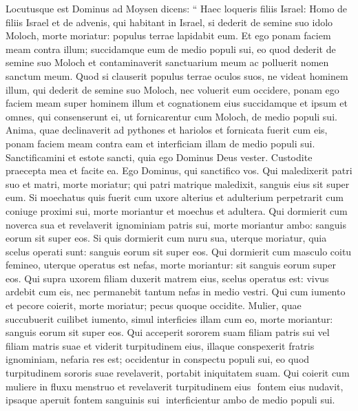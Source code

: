 \begin{biblechapter}
\begin{biblechapter}
\begin{biblechapter}
\begin{biblechapter}
\begin{biblechapter}
\begin{biblechapter}
\begin{biblechapter}
\begin{biblechapter}
\begin{biblechapter}
\begin{biblechapter}
\begin{biblechapter}
\begin{biblechapter}
\begin{biblechapter}
\begin{biblechapter}
\begin{biblechapter}
\begin{biblechapter}
\begin{biblechapter}
\begin{biblechapter}
\begin{biblechapter}
\begin{biblechapter}
\verse Locutusque est Dominus ad Moysen dicens: 
\verse “ Haec loqueris filiis Israel: Homo de filiis Israel et de advenis, qui habitant in Israel, si dederit de semine suo idolo Moloch, morte moriatur: populus terrae lapidabit eum. 
\verse Et ego ponam faciem meam contra illum; succidamque eum de medio populi sui, eo quod dederit de semine suo Moloch et contaminaverit sanctuarium meum ac polluerit nomen sanctum meum. 
\verse Quod si clauserit populus terrae oculos suos, ne videat hominem illum, qui dederit de semine suo Moloch, nec voluerit eum occidere, 
\verse ponam ego faciem meam super hominem illum et cognationem eius succidamque et ipsum et omnes, qui consenserunt ei, ut fornicarentur cum Moloch, de medio populi sui.
 \verse Anima, quae declinaverit ad pythones et hariolos et fornicata fuerit cum eis, ponam faciem meam contra eam et interficiam illam de medio populi sui. 
\verse Sanctificamini et estote sancti, quia ego Dominus Deus vester. 
\verse Custodite praecepta mea et facite ea. Ego Dominus, qui sanctifico vos.
 \verse Qui maledixerit patri suo et matri, morte moriatur; qui patri matrique maledixit, sanguis eius sit super eum.
 \verse Si moechatus quis fuerit cum uxore alterius et adulterium perpetrarit cum coniuge proximi sui, morte moriantur et moechus et adultera.
 \verse Qui dormierit cum noverca sua et revelaverit ignominiam patris sui, morte moriantur ambo: sanguis eorum sit super eos.
 \verse Si quis dormierit cum nuru sua, uterque moriatur, quia scelus operati sunt: sanguis eorum sit super eos.
 \verse Qui dormierit cum masculo coitu femineo, uterque operatus est nefas, morte moriantur: sit sanguis eorum super eos.
 \verse Qui supra uxorem filiam duxerit matrem eius, scelus operatus est: vivus ardebit cum eis, nec permanebit tantum nefas in medio vestri.
 \verse Qui cum iumento et pecore coierit, morte moriatur; pecus quoque occidite. 
 \verse Mulier, quae succubuerit cuilibet iumento, simul interficies illam cum eo, morte moriantur: sanguis eorum sit super eos.
 \verse Qui acceperit sororem suam filiam patris sui vel filiam matris suae et viderit turpitudinem eius, illaque conspexerit fratris ignominiam, nefaria res est; occidentur in conspectu populi sui, eo quod turpitudinem sororis suae revelaverit, portabit iniquitatem suam.
 \verse Qui coierit cum muliere in fluxu menstruo et revelaverit turpitudinem eius ­ fontem eius nudavit, ipsaque aperuit fontem sanguinis sui ­ interficientur ambo de medio populi sui.

\end{biblechapter}
\end{biblechapter}
\end{biblechapter}
\end{biblechapter}
\end{biblechapter}
\end{biblechapter}
\end{biblechapter}
\end{biblechapter}
\end{biblechapter}
\end{biblechapter}
\end{biblechapter}
\end{biblechapter}
\end{biblechapter}
\end{biblechapter}
\end{biblechapter}
\end{biblechapter}
\end{biblechapter}
\end{biblechapter}
\end{biblechapter}
\end{biblechapter}

